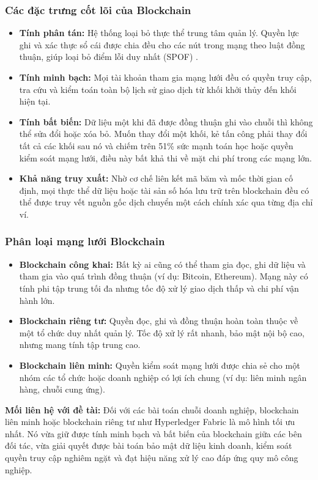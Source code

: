\documentclass[12pt,a4paper]{article}
\begin{document}
\subsubsection{Các đặc trưng cốt lõi của Blockchain}
\begin{itemize}
    \item \textbf{Tính phân tán:} Hệ thống loại bỏ thực thể trung tâm quản lý. Quyền lực ghi và xác thực sổ cái được chia đều cho các nút trong mạng theo luật đồng thuận, giúp loại bỏ điểm lỗi duy nhất (SPOF) \cite{antonopoulos}.
    \item \textbf{Tính minh bạch:} Mọi tài khoản tham gia mạng lưới đều có quyền truy cập, tra cứu và kiểm toán toàn bộ lịch sử giao dịch từ khối khởi thủy đến khối hiện tại.
    \item \textbf{Tính bất biến:} Dữ liệu một khi đã được đồng thuận ghi vào chuỗi thì không thể sửa đổi hoặc xóa bỏ. Muốn thay đổi một khối, kẻ tấn công phải thay đổi tất cả các khối sau nó và chiếm trên 51\% sức mạnh toán học hoặc quyền kiểm soát mạng lưới, điều này bất khả thi về mặt chi phí trong các mạng lớn.
    \item \textbf{Khả năng truy xuất:} Nhờ cơ chế liên kết mã băm và mốc thời gian cố định, mọi thực thể dữ liệu hoặc tài sản số hóa lưu trữ trên blockchain đều có thể được truy vết nguồn gốc dịch chuyển một cách chính xác qua từng địa chỉ ví.
\end{itemize}

\subsubsection{Phân loại mạng lưới Blockchain}
\begin{itemize}
    \item \textbf{Blockchain công khai:} Bất kỳ ai cũng có thể tham gia đọc, ghi dữ liệu và tham gia vào quá trình đồng thuận (ví dụ: Bitcoin, Ethereum). Mạng này có tính phi tập trung tối đa nhưng tốc độ xử lý giao dịch thấp và chi phí vận hành lớn.
    \item \textbf{Blockchain riêng tư:} Quyền đọc, ghi và đồng thuận hoàn toàn thuộc về một tổ chức duy nhất quản lý. Tốc độ xử lý rất nhanh, bảo mật nội bộ cao, nhưng mang tính tập trung cao.
    \item \textbf{Blockchain liên minh:} Quyền kiểm soát mạng lưới được chia sẻ cho một nhóm các tổ chức hoặc doanh nghiệp có lợi ích chung (ví dụ: liên minh ngân hàng, chuỗi cung ứng).
\end{itemize}
\textbf{Mối liên hệ với đề tài:} Đối với các bài toán chuỗi doanh nghiệp, blockchain liên minh hoặc blockchain riêng tư như Hyperledger Fabric là mô hình tối ưu nhất. Nó vừa giữ được tính minh bạch và bất biến của blockchain giữa các bên đối tác, vừa giải quyết được bài toán bảo mật dữ liệu kinh doanh, kiểm soát quyền truy cập nghiêm ngặt và đạt hiệu năng xử lý cao đáp ứng quy mô công nghiệp.
\end{document}
